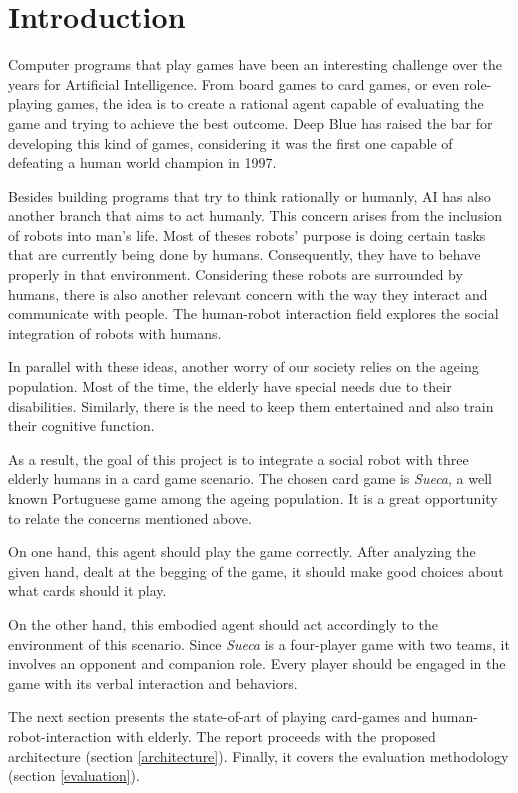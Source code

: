 \section{Introduction} \label{introduction}

Computer programs that play games have been an interesting challenge over the years for Artificial Intelligence. From board games to card games, or even role-playing games, the idea is to create a rational agent capable of evaluating the game and trying to achieve the best outcome. Deep Blue has raised the bar for developing this kind of games, considering it was the first one capable of defeating a human world champion in 1997.

Besides building programs that try to think rationally or humanly, AI has also another branch that aims to act humanly. This concern arises from the inclusion of robots into man's life. Most of theses robots' purpose is doing certain tasks that are currently being done by humans. Consequently, they have to behave properly in that environment. Considering these robots are surrounded by humans, there is also another relevant concern with the way they interact and communicate with people. The human-robot interaction field explores the social integration of robots with humans.

In parallel with these ideas, another worry of our society relies on the ageing population. Most of the time, the elderly have special needs due to their disabilities. Similarly, there is the need to keep them entertained and also train their cognitive function. 

As a result, the goal of this project is to integrate a social robot with three elderly humans in a card game scenario. The chosen card game is \emph{Sueca}, a well known Portuguese game among the ageing population. It is a great opportunity to relate the concerns mentioned above.

On one hand, this agent should play the game correctly. After analyzing the given hand, dealt at the begging of the game, it should make good choices about what cards should it play.

On the other hand, this embodied agent should act accordingly to the environment of this scenario. Since \emph{Sueca} is a four-player game with two teams, it involves an opponent and companion role. Every player should be engaged in the game with its verbal interaction and behaviors.


The next section presents the state-of-art of playing card-games and human-robot-interaction with elderly. The report proceeds with the proposed architecture (section \ref{architecture}). Finally, it covers the evaluation methodology (section \ref{evaluation}). 